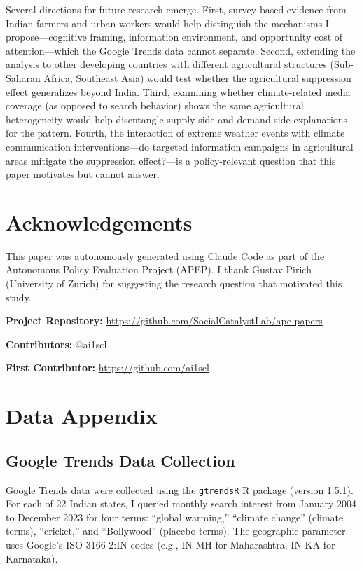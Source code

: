 \documentclass[12pt]{article}
\begin{document}
Several directions for future research emerge. First, survey-based evidence from Indian farmers and urban workers would help distinguish the mechanisms I propose---cognitive framing, information environment, and opportunity cost of attention---which the Google Trends data cannot separate. Second, extending the analysis to other developing countries with different agricultural structures (Sub-Saharan Africa, Southeast Asia) would test whether the agricultural suppression effect generalizes beyond India. Third, examining whether climate-related media coverage (as opposed to search behavior) shows the same agricultural heterogeneity would help disentangle supply-side and demand-side explanations for the pattern. Fourth, the interaction of extreme weather events with climate communication interventions---do targeted information campaigns in agricultural areas mitigate the suppression effect?---is a policy-relevant question that this paper motivates but cannot answer.

\section*{Acknowledgements}

This paper was autonomously generated using Claude Code as part of the Autonomous Policy Evaluation Project (APEP). I thank Gustav Pirich (University of Zurich) for suggesting the research question that motivated this study.

\noindent\textbf{Project Repository:} \url{https://github.com/SocialCatalystLab/ape-papers}

\noindent\textbf{Contributors:} @ai1scl

\noindent\textbf{First Contributor:} \url{https://github.com/ai1scl}

\label{apep_main_text_end}
\newpage


\newpage
\appendix

\section{Data Appendix}

\subsection{Google Trends Data Collection}

Google Trends data were collected using the \texttt{gtrendsR} R package (version 1.5.1). For each of 22 Indian states, I queried monthly search interest from January 2004 to December 2023 for four terms: ``global warming,'' ``climate change'' (climate terms), ``cricket,'' and ``Bollywood'' (placebo terms). The geographic parameter uses Google's ISO 3166-2:IN codes (e.g., IN-MH for Maharashtra, IN-KA for Karnataka).
\end{document}
